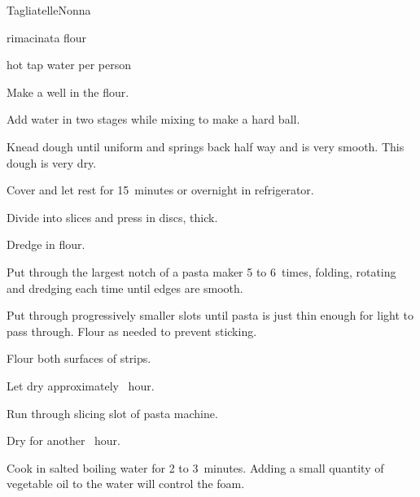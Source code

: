 \begin{recipe}{Tagliatelle}{Nonna}{}

\begin{ingredients}
\item {} rimacinata flour
\item {} hot tap water per person
\end{ingredients}

\begin{directions}
\item Make a well in the flour.
\item Add water in two stages while mixing to make a hard ball.
\item Knead dough until uniform and springs back half way and is very smooth. This dough is very dry.
\item Cover and let rest for 15~minutes or overnight in refrigerator.
\item Divide into slices and press in  discs, \inch{\threequarter} thick.
\item Dredge in flour.
\item Put through the largest notch of a pasta maker 5 to 6~times, folding, rotating and dredging each time until edges are smooth.
\item Put through progressively smaller slots until pasta is just thin enough for light to pass through. Flour as needed to prevent sticking.
\item Flour both surfaces of strips.
\item Let dry approximately \half~hour.
\item Run through slicing slot of pasta machine.
\item Dry for another \half~hour.
\item Cook in salted boiling water for 2 to 3~minutes. Adding a small quantity of vegetable oil to the water will control the foam.
\end{directions}

\end{recipe}

